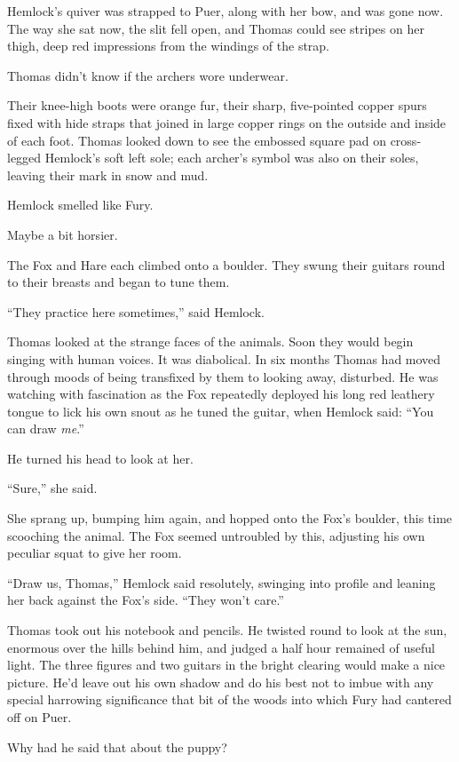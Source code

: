 \documentclass[11pt,a5paper]{article}
\begin{document}
Hemlock's quiver was strapped to Puer, along with her bow, and was gone now. The way she sat now, the slit fell open, and Thomas could see stripes on her thigh, deep red impressions from the windings of the strap.

Thomas didn't know if the archers wore underwear.

Their knee-high boots were orange fur, their sharp, five-pointed copper spurs fixed with hide straps that joined in large copper rings on the outside and inside of each foot. Thomas looked down to see the embossed square pad on cross-legged Hemlock's soft left sole; each archer's symbol was also on their soles, leaving their mark in snow and mud.

Hemlock smelled like Fury.

Maybe a bit horsier.

The Fox and Hare each climbed onto a boulder. They swung their guitars round to their breasts and began to tune them.

``They practice here sometimes,'' said Hemlock.

Thomas looked at the strange faces of the animals. Soon they would begin singing with human voices. It was diabolical. In six months Thomas had moved through moods of being transfixed by them to looking away, disturbed. He was watching with fascination as the Fox repeatedly deployed his long red leathery tongue to lick his own snout as he tuned the guitar, when Hemlock said: ``You can draw \emph{me}.''

He turned his head to look at her.

``Sure,'' she said.

She sprang up, bumping him again, and hopped onto the Fox's boulder, this time scooching the animal. The Fox seemed untroubled by this, adjusting his own peculiar squat to give her room.

``Draw us, Thomas,'' Hemlock said resolutely, swinging into profile and leaning her back against the Fox's side. ``They won't care.''

Thomas took out his notebook and pencils. He twisted round to look at the sun, enormous over the hills behind him, and judged a half hour remained of useful light. The three figures and two guitars in the bright clearing would make a nice picture. He'd leave out his own shadow and do his best not to imbue with any special harrowing significance that bit of the woods into which Fury had cantered off on Puer.

Why had he said that about the puppy?
\end{document}
